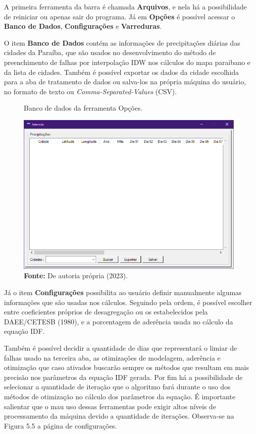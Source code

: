 A primeira ferramenta da barra é chamada \textbf{Arquivos}, e nela há a possibilidade de reiniciar ou apenas sair do programa. Já em \textbf{Opções} é possível acessar o \textbf{Banco de Dados}, \textbf{Configurações} e \textbf{Varreduras}.

O item  \textbf{Banco de Dados} contém as informações de precipitações diárias das cidades da Paraíba, que são usados no desenvolvimento do método de preenchimento de falhas por interpolação IDW nos cálculos do mapa paraibano e da lista de cidades. Também é possível exportar os dados da cidade escolhida para a aba de tratamento de dados ou salva-los na própria máquina do usuário, no formato de texto ou \textit{Comma-Separated-Values} (CSV).\bigskip

\begin{figure}[!ht]
	\centering
	\caption{Banco de dados da ferramenta Opções.}
	\includegraphics[width=.7625\linewidth]{figuras/banco_de_dados.png}
	\caption*{\textbf{Fonte:} De autoria própria (2023).}
	\label{fig:banco_de_dados.png}
\end{figure}

Já o item \textbf{Configurações} possibilita ao usuário definir manualmente algumas informações que são usadas nos cálculos. Seguindo pela ordem, é possível escolher entre coeficientes próprios de desagregação ou os estabelecidos pela DAEE/CETESB (1980), e a porcentagem de aderência usada no cálculo da equação IDF.

Também é possível decidir a quantidade de dias que representará o limiar de falhas usado na terceira aba, as otimizações de modelagem, aderência e otimização que caso ativados buscarão sempre os métodos que resultam em mais precisão nos parâmetros da equação IDF gerada. Por fim há a possibilidade de selecionar a quantidade de iteração que o algoritmo fará durante o uso dos métodos de otimização no cálculo dos parâmetros da equação. É importante salientar que o mau uso dessas ferramentas pode exigir altos níveis de processamento da máquina devido a quantidade de iterações. Observa-se na Figura 5.5 a página de configurações.

